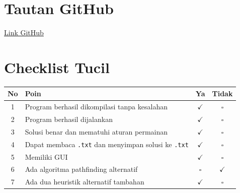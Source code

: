 \section{Tautan GitHub}
\href{https://github.com/parkuskus/Tucil3_13524061}{Link GitHub}

\section{Checklist Tucil}

\begin{table}[H]
    \centering
    \renewcommand{\arraystretch}{1.2}
    \begin{tabular}{|c|p{9cm}|c|c|}
        \hline
        No & Poin                                                              & Ya           & Tidak        \\
        \hline
        1  & Program berhasil dikompilasi tanpa kesalahan                      & $\checkmark$ & $\square$    \\
        \hline
        2  & Program berhasil dijalankan                                       & $\checkmark$ & $\square$    \\
        \hline
        3  & Solusi benar dan mematuhi aturan permainan                        & $\checkmark$ & $\square$    \\
        \hline
        4  & Dapat membaca \texttt{.txt} dan menyimpan solusi ke \texttt{.txt} & $\checkmark$ & $\square$    \\
        \hline
        5  & Memiliki GUI                                                      & $\checkmark$ & $\square$    \\
        \hline
        6  & Ada algoritma pathfinding alternatif                              & $\square$    & $\checkmark$ \\
        \hline
        7  & Ada dua heuristik alternatif tambahan                             & $\checkmark$ & $\square$    \\
        \hline
    \end{tabular}
\end{table}
